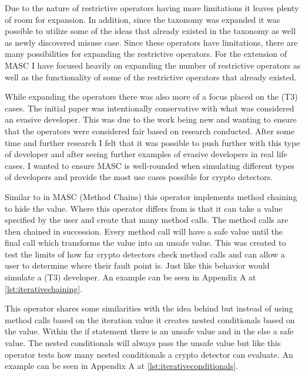 Due to the nature of restrictive operators having more limitations it leaves plenty of room for expansion. In addition, since the taxonomy was expanded it was possible to utilize some of the ideas that already existed in the taxonomy as well as newly discovered misuse case. Since these operators have limitations, there are many possibilities for expanding the restrictive operators. For the extension of MASC I have focused heavily on expanding the number of restrictive operators as well as the functionality of some of the restrictive operators that already existed.

While expanding the operators there was also more of a focus placed on the (T3) cases. The initial paper was intentionally conservative with what was considered an evasive developer. This was due to the work being new and wanting to ensure that the operators were considered fair based on research conducted. After some time and further research I felt that it was possible to push further with this type of developer and after seeing further examples of evasive developers in real life cases. I wanted to ensure MASC is well-rounded when simulating different types of developers and provide the most use cases possible for crypto detectors.


 Similar to in MASC  (Method Chains) this operator implements method chaining to hide the value. Where this operator differs from  is that it can take a value specified by the user and create that many method calls. The method calls are then chained in succession. Every method call will have a safe value until the final call which transforms the value into an unsafe value. This was created to test the limits of how far crypto detectors check method calls and can allow a user to determine where their fault point is. Just like  this behavior would simulate a (T3) developer. An example can be seen in Appendix A at \ref{lst:iterativechaining}.

 This operator shares some similarities with the idea behind  but instead of using method calls based on the iteration value it creates nested conditionals based on the value. Within the if statement there is an unsafe value and in the else a safe value. The nested conditionals will always pass the unsafe value but like  this operator tests how many nested conditionals a crypto detector can evaluate. An example can be seen in Appendix A at \ref{lst:iterativeconditionals}.

